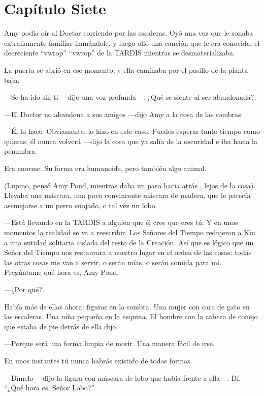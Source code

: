\chapter*{Capítulo Siete} 

Amy podía oír al Doctor corriendo por las escaleras. Oyó una voz que le sonaba extrañamente familiar llamándole, y luego olló una canción que le era conocida: el decreciente ``vwrop'' ``vwrop'' de la TARDIS mientras se desmaterializaba.

La puerta se abrió en ese momento, y ella caminaba por el pasillo de la planta baja.

---Se ha ido sin ti ---dijo una voz profunda---. ¿Qué se siente al ser abandonada?.

---El Doctor no abandona a sus amigos ---dijo Amy a la cosa de las sombras.

---Él lo hace. Obviamente, lo hizo en este caso. Puedes esperar tanto tiempo como quieras, él nunca volverá ---dijo la cosa que ya salía de la oscuridad e iba hacia la penumbra.

Era enorme. Su forma era humanoide, pero también algo animal.

(Lupino, pensó Amy Pond, mientras daba un paso hacia atrás , lejos de la cosa). Llevaba una máscara, una poco convincente máscara de madera, que le parecía asemejarse a un perro enojado, o tal vez un lobo.

---Está llevando en la TARDIS a alguien que él cree que eres tú. Y en unos momentos la realidad se va a reescribir. Los Señores del Tiempo redujeron a Kin a una entidad solitaria aislada del resto de la Creación. Así que es lógico que un Señor del Tiempo nos restaurara a nuestro lugar en el orden de las cosas: todas las otras cosas me van a servir, o serán mías, o serán comida para mí. Pregúntame qué hora es, Amy Pond.

---¿Por qué?.

Había más de ellas ahora: figuras en la sombra. Una mujer con cara de gato en las escaleras. Una niña pequeña en la esquina. El hombre con la cabeza de conejo que estaba de pie detrás de ella dijo

---Porque será una forma limpia de morir. Una manera fácil de irse.

En unos instantes tú nunca habrás existido de todas formas.

---Dímelo ---dijo la figura con máscara de lobo que había frente a ella---. Dí, ``¿Qué hora es, Señor Lobo?''.

